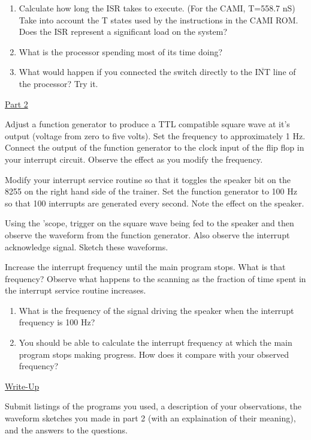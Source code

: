 \begin{enumerate}

\item Calculate how long the ISR takes to execute. (For the CAMI, T=558.7 nS)
Take into account the T states used by the instructions in the CAMI ROM.
Does the ISR represent a significant load on the system?

\item What is the processor spending most of its time doing?

\item What would happen if you connected the switch directly
to the $\overline{\mbox{INT}}$ line of the processor? Try it.

\end{enumerate}

\underline{\large{Part 2}}

Adjust a function generator to produce a TTL compatible square wave at it's
output (voltage from zero to five volts). Set the frequency to
approximately 1 Hz. Connect the output of the function generator to the
clock input of the flip flop in your interrupt circuit. Observe the effect
as you modify the frequency.

Modify your interrupt service routine so that it toggles the speaker bit on
the 8255 on the right hand side of the trainer. Set the function generator
to 100 Hz so that 100 interrupts are generated every second. Note the
effect on the speaker.

Using the 'scope, trigger on the square wave being fed to the speaker and
then observe the waveform from the function generator. Also observe the
interrupt acknowledge signal. Sketch these waveforms.

Increase the interrupt frequency until the main program stops. What is that
frequency? Observe what happens to the scanning as the fraction of time
spent in the interrupt service routine increases.

\begin{enumerate}

\item What is the frequency of the signal driving the speaker when the
interrupt frequency is 100 Hz?

\item You should be able to calculate the interrupt frequency at which
the main program stops making progress. How does it compare with your
observed frequency?

\end{enumerate}

\underline{\large{Write-Up}}

Submit listings of the programs you used, a description of your
observations, the waveform sketches you made in part 2 (with an
explaination of their meaning), and the answers to the questions.


